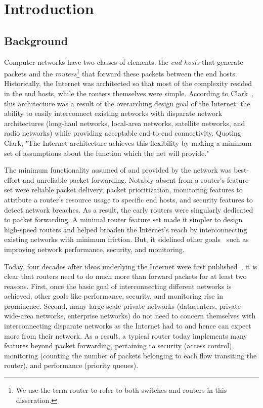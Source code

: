 \chapter{Introduction}
\label{chap:intro}

\section{Background}

Computer networks have two classes of elements: the \textit{end hosts} that
generate packets and the \textit{routers}\footnote{We use the term router to
refer to both switches and routers in this disseration.} that forward these
packets between the end hosts. Historically, the Internet was architected so
that most of the complexity resided in the end hosts, while the routers
themselves were simple. According to Clark~\cite{design_philosophy}, this
architecture was a result of the overarching design goal of the Internet: the
ability to easily interconnect existing networks with disparate network
architectures (\eg long-haul networks, local-area networks, satellite networks,
and radio networks) while providing acceptable end-to-end connectivity. Quoting
Clark, "The Internet architecture achieves this flexibility by making a minimum
set of assumptions about the function which the net will provide."

The minimum functionality assumed of and provided by the network was
best-effort and unreliable packet forwarding. Notably absent from a router's
feature set were reliable packet delivery, packet prioritization, monitoring
features to attribute a router's resource usage to specific end hosts, and
security features to detect network breaches. As a result, the early routers
were singularly dedicated to packet forwarding. A minimal router feature set
made it simpler to design high-speed routers and helped broaden the Internet's
reach by interconnecting existing networks with minimum friction. But, it
sidelined other goals~\cite{design_philosophy} such as improving network
performance, security, and monitoring.
 
Today, four decades after ideas underlying the Internet were first
published~\cite{cerf74}, it is clear that routers need to do much more than
forward packets for at least two reasons. First, once the basic goal of
interconnecting different networks is achieved, other goals like performance,
security, and monitoring rise in prominence.  Second, many large-scale private
networks (\eg datacenters, private wide-area networks, enterprise networks) do
not need to concern themselves with interconnecting disparate networks as the
Internet had to and hence can expect more from their network. As a result, a
typical router today implements many features beyond packet forwarding,
pertaining to security (\eg access control), monitoring (\eg counting the
number of packets belonging to each flow transiting the router), and
performance (\eg priority queues).


